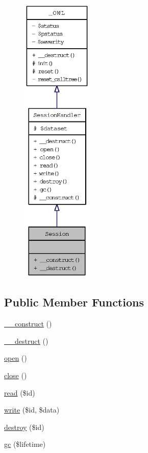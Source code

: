 \begin{figure}[H]
\begin{center}
\leavevmode
\includegraphics[height=400pt]{classSession__coll__graph}
\end{center}
\end{figure}
\subsection*{Public Member Functions}
\begin{CompactItemize}
\item 
\hyperlink{classSession_36373ba15d6c8f932aeea02d7320d7c8}{\_\-\_\-construct} ()
\item 
\hyperlink{classSession_a498272c85524e4700abc3363883165b}{\_\-\_\-destruct} ()
\item 
\hyperlink{classSessionHandler_50aa0b123f53d99de350a0eb02b4bfa5}{open} ()
\item 
\hyperlink{classSessionHandler_335ced83731c7e3e685b7e0df2989c79}{close} ()
\item 
\hyperlink{classSessionHandler_58cc3e5bf5b14e7bfbc73162de1f5d2b}{read} (\$id)
\item 
\hyperlink{classSessionHandler_b59071ef0d3deee2472c6916471bd9f5}{write} (\$id, \$data)
\item 
\hyperlink{classSessionHandler_4e43712ef307979de1b12039ef801adb}{destroy} (\$id)
\item 
\hyperlink{classSessionHandler_c33097332375ae3f8a43c31cef6db0e8}{gc} (\$lifetime)
\end{CompactItemize}
